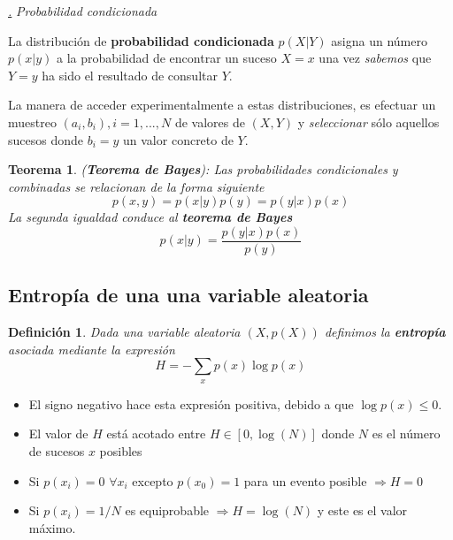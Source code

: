 \documentclass[a4paper,11pt]{book} %
\newtheorem{teorema_contador}{Teorema}
\newcommand{\Teorema}[1]{
		\begin{mybox_gray2}{}
			\begin{teorema_contador}
				 #1 
			\end{teorema_contador} 
		\end{mybox_gray2}
	}
\newtheorem{definicion_contador}{Definición}
\newcommand{\Definicion}[1]{
		\begin{mybox_gray2}{}
			\begin{definicion_contador}
				 #1 
			\end{definicion_contador} 
		\end{mybox_gray2}
	}
\numberwithin{equation}{chapter}
\def\subsubiContadorIt{\par\addtocounter{subsubsection}{1}\underline{\it\thesubsubsection.}\hskip0.5cm \setcounter{subsubsubsectionIt}{0}}
\newcommand{\SubsubiIt}[1]{
		\subsubiContadorIt \textit{#1}
	}
\newcounter{subsubsubsectionIt}[subsubsection]
\begin{document}
			\SubsubiIt{Probabilidad condicionada}

\begin{mybox_gray2}{}
La distribución de \textbf{probabilidad condicionada} $p(X|Y)$ asigna un número $p(x|y)$ a la probabilidad  de encontrar un suceso $X=x$ una vez \textit{sabemos} que $Y=y$ ha sido el resultado de consultar $Y$. 
\end{mybox_gray2}

La manera de acceder experimentalmente a estas distribuciones, es efectuar un muestreo $(a_i,b_i), i=1,...,N$ de valores de $(X,Y)$ y \textit{seleccionar} sólo aquellos sucesos donde $b_i = y$ un valor concreto de $Y$.

\Teorema{ (\textbf{Teorema de Bayes}): 
Las probabilidades condicionales y combinadas se relacionan de la forma siguiente
	\begin{equation}
	p(x,y) = p(x|y)p(y) = p(y|x) p(x)
	\end{equation}
La segunda igualdad conduce al \textbf{teorema de Bayes}
	\begin{equation}
	p(x|y) = \frac{p(y|x)p(x)}{p(y)}
	\end{equation}
}

		\subsection{Entropía de una una variable aleatoria}

	\Definicion{
	Dada una variable aleatoria $(X,p(X))$ definimos la \textbf{entropía} asociada mediante la expresión
     	\begin{equation}
     	H = -\sum_x p(x)\log p(x)
     	\end{equation}
	}

\begin{itemize}
	\item El signo negativo hace esta expresión positiva, debido a que $\log p(x)\leq 0$.
	
	\item El valor de $H$ está acotado entre $H\in [0,\log(N)]$ donde $N$ es el número de sucesos $x$ posibles
	
	\item Si $p(x_i)=0 \,\,  \forall x_i$ excepto $p(x_0)=1$ para un evento posible $\Rightarrow H=0$
	
	\item Si $p(x_i) = 1/N$ es equiprobable $\Rightarrow H = \log(N)$ y este es el valor máximo. 
	
\end{itemize}
\end{document}
